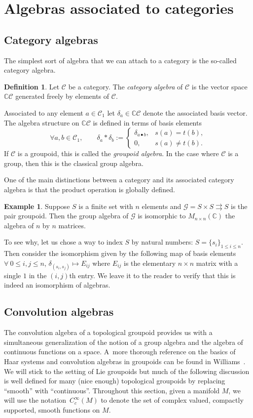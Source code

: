 \documentclass[pdftex]{sigma}
\numberwithin{equation}{section}
\theoremstyle{definition}
\newtheorem{Definition}[Theorem]{Definition}
\newtheorem{Example}[Theorem]{Example}
\newcommand{\BBC}{\mathbb{C}}
\newcommand{\CG}{\mathcal{G}}
\newcommand{\CC}{\mathcal{C}}
\newcommand{\grpd}{\rightrightarrows}
\begin{document}
\section{Algebras associated to categories}

\subsection{Category algebras}
The simplest sort of algebra that we can attach to a category is the so-called category algebra.
\begin{Definition}\label{def:category.algebra}
  Let $ \CC $ be a category. The \emph{category algebra} of $ \CC $ is the vector space $ \BBC \CC $ generated freely by elements of $ \CC $.

   Associated to any element $ a \in \CC_1 $ let $ \delta_a \in \BBC \CC $ denote the associated basis vector. The algebra structure on $ \BBC \CC $ is defined in terms of basis elements
  \[ \forall a, b \in \CC_1, \qquad \delta_a * \delta_b := \begin{cases}
    \delta_{a \bullet b}, & s(a) = t(b), \\
    0, & s(a) \neq t(b).
  \end{cases} \]
  If $ \CC $ is a groupoid, this is called the \emph{groupoid algebra}. In the case where $ \CC $ is a group, then this is the classical group algebra.
\end{Definition}
One of the main distinctions between a category and its associated category algebra is that the product operation is globally defined.
\begin{Example}
   Suppose $ S $ is a finite set with $ n $ elements and $ \CG = S \times S \grpd S $ is the pair groupoid. Then the group algebra of $ \CG $ is isomorphic to $ M_{n \times n}(\BBC) $ the algebra of $ n $ by $ n $ matrices.

   To see why, let us chose a way to index $ S $ by natural numbers: $ S = \{ s_i \}_{1 \le i \le n} $. Then consider the isomorphism given by the following map of basis elements $\forall\ 0 \le i,j \le n$, $\delta_{(s_i,s_j)} \mapsto E_{ij}$
   where $ E_{ij}$ is the elementary $ n \times n$ matrix with a single $ 1 $ in the $ (i,j)$th entry. We leave it to the reader to verify that this is indeed an isomorphism of algebras.
\end{Example}

\subsection{Convolution algebras}
The convolution algebra of a topological groupoid provides us with a simultaneous generalization of the notion of a group algebra and the algebra of continuous functions on a space. A~more thorough reference on the basics of Haar systems and convolution algebras in groupoids can be found in Williams~\cite{DanaWilliamsBook}.
We will stick to the setting of Lie groupoids but much of the following discussion is well defined for many (nice enough) topological groupoids by replacing ``smooth'' with ``continuous''. Throughout this section, given a manifold $ M $, we will use the notation~$ C_c^\infty(M)$ to denote the set of complex valued, compactly supported, smooth functions on $ M $.
\end{document}
